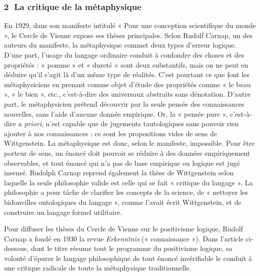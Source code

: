 \subsubsection*{\textcircled{\scriptsize 2} La critique de la métaphysique}
En 1929, dans son manifeste intitulé « Pour une conception scientifique du monde », le Cercle de Vienne expose ses thèses principales. Selon Rudolf Carnap, un des auteurs du manifeste, la métaphysique commet deux types d’erreur logique. D’une part, l’usage du langage ordinaire conduit à confondre des choses et des propriétés : « pomme » et « dureté » sont deux substantifs, mais on ne peut en déduire qu’il s’agit là d’un même type de réalités. C’est pourtant ce que font les métaphysiciens en prenant comme objet d’étude des propriétés comme « le beau », « le bien », etc., c’est-à-dire des universaux abstraits sans dénotation. D’autre part, le métaphysicien prétend découvrir par la seule pensée des connaissances nouvelles, sans l’aide d’aucune donnée empirique. Or, la « pensée pure », c’est-à-dire \textit{a priori}, n’est capable que de jugements tautologiques sans pouvoir rien ajouter à nos connaissances : ce sont les propositions vides de sens de Wittgenstein. La métaphysique est donc, selon le manifeste, impossible. Pour être porteur de sens, un énoncé doit pouvoir se réduire à des données empiriquement observables, et tout énoncé qui n’a pas de base empirique ou logique est jugé insensé. Rudolph Carnap reprend également la thèse de Wittgenstein selon laquelle la seule philosophie valide est celle qui se fait « critique du langage ». La philosophie a pour tâche de clarifier les concepts de la science, de « nettoyer les bidonvilles ontologiques du langage », comme l’avait écrit Wittgenstein, et de construire un langage formel utilitaire.

Pour diffuser les thèses du Cercle de Vienne sur le positivisme logique, Rudolf Carnap a fondé en 1930 la revue \textit{Erkenntnis} (« connaissance »). Dans l’article ci-dessous, dont le titre résume tout le programme du positivisme logique, sa volonté d’épurer le langage philosophique de tout énoncé invérifiable le conduit à une critique radicale de toute la métaphysique traditionnelle.

